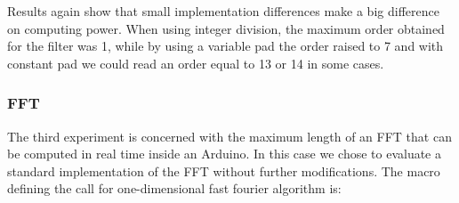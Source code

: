 
Results again show that small implementation differences make a big difference on computing power. When using integer division, the maximum order obtained for the filter was 1, while by using a variable pad the order raised to 7 and with constant pad we could read an order equal to 13 or 14 in some cases. 


%



%

\subsubsection{FFT}
\label{sec:results-fft}

The third experiment is concerned with the maximum length of an FFT that can
be computed in real time inside an Arduino. In this case we chose to evaluate a standard implementation of the FFT without further modifications. The macro defining the call for one-dimensional fast fourier algorithm is:

